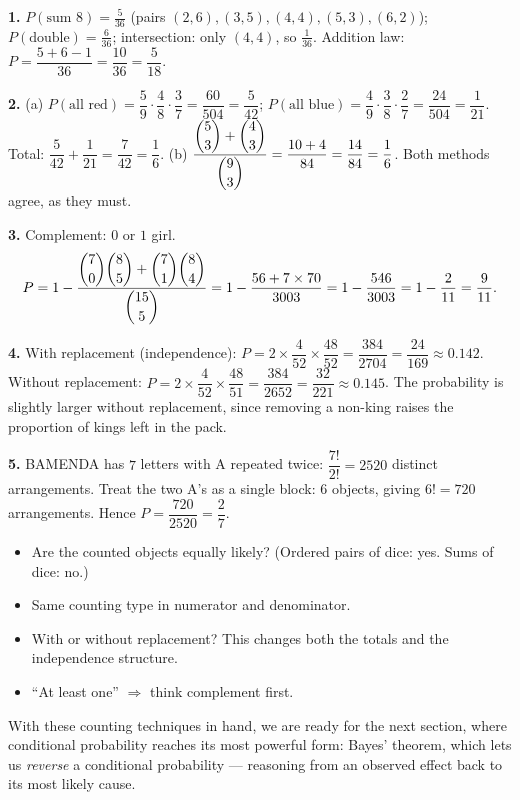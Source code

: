 \documentclass[11pt]{article}
\begin{document}
\begin{corrige}[Exercise 1]
\textbf{1.} $P(\text{sum }8)=\frac{5}{36}$ (pairs $(2,6),(3,5),(4,4),(5,3),(6,2)$); $P(\text{double})=\frac{6}{36}$; intersection: only $(4,4)$, so $\frac{1}{36}$. Addition law: $P=\dfrac{5+6-1}{36}=\dfrac{10}{36}=\dfrac{5}{18}$.

\textbf{2.} (a) $P(\text{all red})=\dfrac{5}{9}\cdot\dfrac{4}{8}\cdot\dfrac{3}{7}=\dfrac{60}{504}=\dfrac{5}{42}$; $P(\text{all blue})=\dfrac{4}{9}\cdot\dfrac{3}{8}\cdot\dfrac{2}{7}=\dfrac{24}{504}=\dfrac{1}{21}$. Total: $\dfrac{5}{42}+\dfrac{1}{21}=\dfrac{7}{42}=\dfrac16$.
(b) $\dfrac{\dbinom{5}{3}+\dbinom{4}{3}}{\dbinom{9}{3}}=\dfrac{10+4}{84}=\dfrac{14}{84}=\dfrac16$. Both methods agree, as they must.

\textbf{3.} Complement: $0$ or $1$ girl.
\[ P=1-\frac{\dbinom{7}{0}\dbinom{8}{5}+\dbinom{7}{1}\dbinom{8}{4}}{\dbinom{15}{5}}=1-\frac{56+7\times 70}{3003}=1-\frac{546}{3003}=1-\frac{2}{11}=\frac{9}{11}. \]

\textbf{4.} With replacement (independence): $P=2\times\dfrac{4}{52}\times\dfrac{48}{52}=\dfrac{384}{2704}=\dfrac{24}{169}\approx 0.142$. Without replacement: $P=2\times\dfrac{4}{52}\times\dfrac{48}{51}=\dfrac{384}{2652}=\dfrac{32}{221}\approx 0.145$. The probability is slightly larger without replacement, since removing a non-king raises the proportion of kings left in the pack.

\textbf{5.} BAMENDA has $7$ letters with A repeated twice: $\dfrac{7!}{2!}=2520$ distinct arrangements. Treat the two A's as a single block: $6$ objects, giving $6!=720$ arrangements. Hence $P=\dfrac{720}{2520}=\dfrac{2}{7}$.
\end{corrige}

\begin{attention}
\begin{itemize}
\item Are the counted objects equally likely? (Ordered pairs of dice: yes. Sums of dice: no.)
\item Same counting type in numerator and denominator.
\item With or without replacement? This changes both the totals and the independence structure.
\item ``At least one'' $\Rightarrow$ think complement first.
\end{itemize}
\end{attention}

With these counting techniques in hand, we are ready for the next section, where conditional probability reaches its most powerful form: Bayes' theorem, which lets us \emph{reverse} a conditional probability --- reasoning from an observed effect back to its most likely cause.
\end{document}
